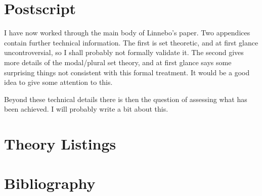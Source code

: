 
\section{Postscript}\label{POSTSCRIPT}

I have now worked through the main body of Linnebo's paper.
Two appendices contain further technical information.
The first is set theoretic, and at first glance uncontroversial, so I shall probably not formally validate it.
The second gives more details of the modal/plural set theory, and at first glance says some surprising things not consistent with this formal treatment.
It would be a good idea to give some attention to this.

Beyond these technical details there is then the question of assessing what has been achieved.
I will probably write a bit about this.

\pagebreak

\appendix

\section{Theory Listings}

{
\let\Section\subsection
\let\Subsection\subsubsection
\def\subsection#1{\Subsection*{#1}}

\def\section#1{\Section{#1}\label{t046a}\index{t046a}}

\pagebreak
\def\section#1{\Section{#1}\label{t046b}\index{t046b}}

}  %


\pagebreak

\section*{Bibliography}\label{BIBLIOGRAPHY}

{\def\section*#1{\ignore{#1}}
\raggedright


} %

{
{\small\printindex}}


